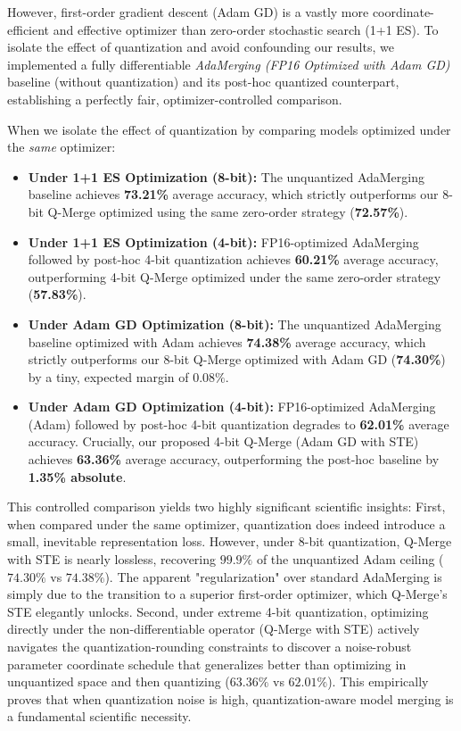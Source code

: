 However, first-order gradient descent (Adam GD) is a vastly more coordinate-efficient and effective optimizer than zero-order stochastic search (1+1 ES). To isolate the effect of quantization and avoid confounding our results, we implemented a fully differentiable \emph{AdaMerging (FP16 Optimized with Adam GD)} baseline (without quantization) and its post-hoc quantized counterpart, establishing a perfectly fair, optimizer-controlled comparison.

When we isolate the effect of quantization by comparing models optimized under the \emph{same} optimizer:
\begin{itemize}
    \item \textbf{Under 1+1 ES Optimization (8-bit):} The unquantized AdaMerging baseline achieves \textbf{73.21\%} average accuracy, which strictly outperforms our 8-bit Q-Merge optimized using the same zero-order strategy (\textbf{72.57\%}).
    \item \textbf{Under 1+1 ES Optimization (4-bit):} FP16-optimized AdaMerging followed by post-hoc 4-bit quantization achieves \textbf{60.21\%} average accuracy, outperforming 4-bit Q-Merge optimized under the same zero-order strategy (\textbf{57.83\%}).
    \item \textbf{Under Adam GD Optimization (8-bit):} The unquantized AdaMerging baseline optimized with Adam achieves \textbf{74.38\%} average accuracy, which strictly outperforms our 8-bit Q-Merge optimized with Adam GD (\textbf{74.30\%}) by a tiny, expected margin of $0.08\%$.
    \item \textbf{Under Adam GD Optimization (4-bit):} FP16-optimized AdaMerging (Adam) followed by post-hoc 4-bit quantization degrades to \textbf{62.01\%} average accuracy. Crucially, our proposed 4-bit Q-Merge (Adam GD with STE) achieves \textbf{63.36\%} average accuracy, outperforming the post-hoc baseline by \textbf{1.35\% absolute}.
\end{itemize}

This controlled comparison yields two highly significant scientific insights:
First, when compared under the same optimizer, quantization does indeed introduce a small, inevitable representation loss. However, under 8-bit quantization, Q-Merge with STE is nearly lossless, recovering $99.9\%$ of the unquantized Adam ceiling ($74.30\%$ vs $74.38\%$). The apparent "regularization" over standard AdaMerging is simply due to the transition to a superior first-order optimizer, which Q-Merge's STE elegantly unlocks.
Second, under extreme 4-bit quantization, optimizing directly under the non-differentiable operator (Q-Merge with STE) actively navigates the quantization-rounding constraints to discover a noise-robust parameter coordinate schedule that generalizes better than optimizing in unquantized space and then quantizing ($63.36\%$ vs $62.01\%$). This empirically proves that when quantization noise is high, quantization-aware model merging is a fundamental scientific necessity.


